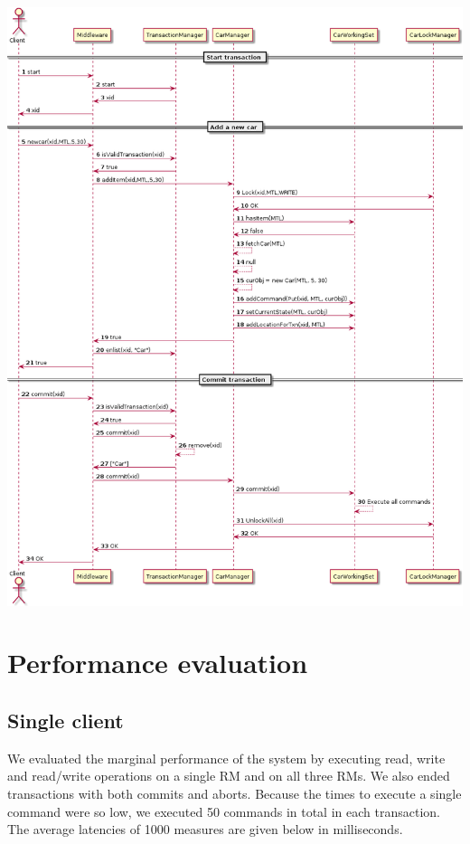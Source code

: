 \documentclass[10pt]{article}
\begin{document}
\begin{center}
\includegraphics[scale=0.4]{sequence_diagram.png}
\end{center}

\section{Performance evaluation}

\subsection{Single client}

We evaluated the marginal performance of the system by executing read,
write and read/write operations on a single RM and on all three RMs.
We also ended transactions with both commits and aborts.  Because the
times to execute a single command were so low, we executed 50 commands
in total in each transaction.  The average latencies of 1000 measures
are given below in milliseconds.
\end{document}

